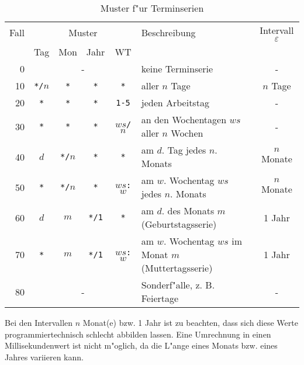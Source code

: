 \documentclass[a4paper]{article}
\numberwithin{equation}{section}
\begin{document}
\setcounter{footnote}{1}
\begin{table}[ht]
  \caption{Muster f"ur Terminserien}
  \label{tab:pattern}
  \begin{tabularx}{\textwidth}{rccccXc}
    \hline
    Fall & \multicolumn{4}{c}{Muster} & Beschreibung & Intervall $\varepsilon$ \\
    & Tag & Mon & Jahr & WT & & \\
    \hline
    0 & \multicolumn{4}{c}{-} & keine Terminserie & - \\
    10 & \texttt{*/$n$} & \texttt{*} & \texttt{*} & \texttt{*} &
      aller $n$ Tage & $n$ Tage \\
    20 & \texttt{*} & \texttt{*} & \texttt{*} & \texttt{1-5} &
      jeden Arbeitstag & - \\
    30 & \texttt{*} & \texttt{*} & \texttt{*} & \texttt{$ws$/$n$} &
      an den Wochentagen $ws$ aller $n$ Wochen & - \\
    40 & \texttt{$d$} & \texttt{*/$n$} & \texttt{*} & \texttt{*} &
      am $d$. Tag jedes $n$. Monats & $n$ Monate \\
    50 & \texttt{*} & \texttt{*/$n$} & \texttt{*} & \texttt{$ws$:$w$} &
      am $w$. Wochentag $ws$ jedes $n$. Monats &
      $n$ Monate\footnotemark[\ref{ft:oneMonth}] \\
    60 & \texttt{$d$} & \texttt{$m$} & \texttt{*/1} & \texttt{*} &
      am $d$. des Monats $m$ (Geburtstagsserie) & 1 Jahr \\
    70 & \texttt{*} & \texttt{$m$} & \texttt{*/1} & \texttt{$ws$:$w$} &
      am $w$. Wochentag $ws$ im Monat $m$ (Muttertagsserie) &
      1 Jahr\footnotemark[\ref{ft:oneMonth}] \\
    80 & \multicolumn{4}{c}{-} & Sonderf"alle, z. B. Feiertage & - \\
    \hline
  \end{tabularx}
\end{table}

\label{badInterval}
Bei den Intervallen $n$ Monat(e) bzw. 1 Jahr ist zu beachten, dass sich diese
Werte programmiertechnisch schlecht abbilden lassen. Eine Umrechnung in einen
Millisekundenwert ist nicht m"oglich, da die L"ange eines Monats bzw. eines
Jahres variieren kann.



%
%
%
%
\end{document}
